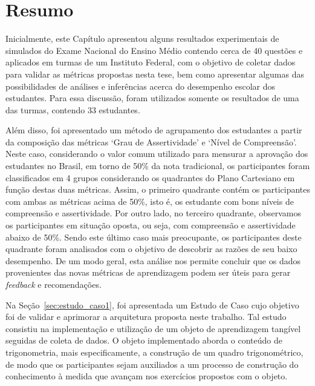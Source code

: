 \newpage
\section{Resumo}
\label{summary:PartialResults}

Inicialmente, este Capítulo apresentou alguns resultados experimentais de simulados do Exame Nacional do Ensino Médio contendo cerca de 40 questões e aplicados em turmas de um Instituto Federal, com o objetivo de coletar dados para validar as métricas propostas nesta tese, bem como apresentar algumas das possibilidades de análises e inferências acerca do desempenho escolar dos estudantes. Para essa discussão, foram utilizados somente os resultados de uma das turmas, contendo 33 estudantes.

Além disso, foi apresentado um método de agrupamento dos estudantes a partir da composição das métricas `Grau de Assertividade' e `Nível de Compreensão'. Neste caso, considerando o valor comum utilizado para mensurar a aprovação dos estudantes no Brasil, em torno de 50\% da nota tradicional, os participantes foram classificados em 4 grupos considerando os quadrantes do Plano Cartesiano em função destas duas métricas. Assim, o primeiro quadrante contém os participantes com ambas as métricas acima de 50\%, isto é, os estudante com bons níveis de compreensão e assertividade. Por outro lado, no terceiro quadrante, observamos os participantes em situação oposta, ou seja, com compreensão e assertividade abaixo de 50\%. Sendo este último caso mais preocupante, os participantes deste quadrante foram analisados com o objetivo de descobrir as razões de seu baixo desempenho. De um modo geral, esta análise nos permite concluir que os dados provenientes das novas métricas de aprendizagem podem ser úteis para gerar \textit{feedback} e recomendações.

Na Seção~\ref{sec:estudo_caso1}, foi apresentada um Estudo de Caso cujo objetivo foi de validar e aprimorar a arquitetura proposta neste trabalho. Tal estudo consistiu na implementação e utilização de um objeto de aprendizagem tangível seguidas de coleta de dados. O objeto implementado aborda o conteúdo de trigonometria, mais especificamente, a construção de um quadro trigonométrico, de modo que os participantes sejam auxiliados a um processo de construção do conhecimento à medida que avançam nos exercícios propostos com o objeto.

